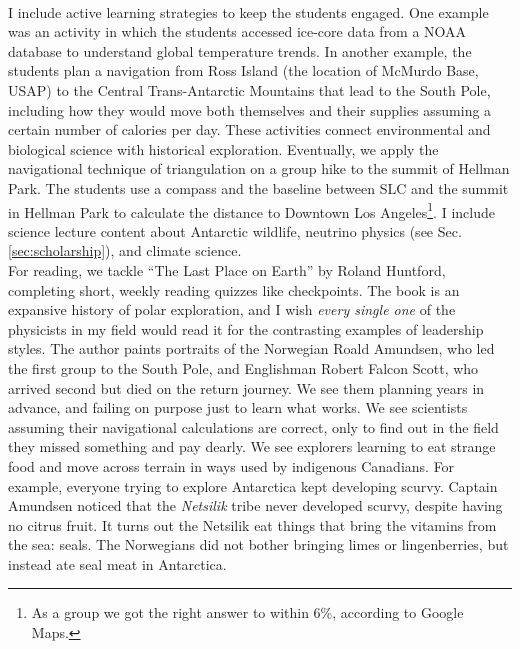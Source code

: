\documentclass[../../../main.tex]{subfiles}
\begin{document}
\\
\vspace{0.15cm}
I include active learning strategies to keep the students engaged.  One example was an activity in which the students accessed ice-core data from a NOAA database to understand global temperature trends.  In another example, the students plan a navigation from Ross Island (the location of McMurdo Base, USAP) to the Central Trans-Antarctic Mountains that lead to the South Pole, including how they would move both themselves and their supplies assuming a certain number of calories per day.  These activities connect environmental and biological science with historical exploration.  Eventually, we apply the navigational technique of triangulation on a group hike to the summit of Hellman Park.  The students use a compass and the baseline between SLC and the summit in Hellman Park to calculate the distance to Downtown Los Angeles\footnote{As a group we got the right answer to within 6\%, according to Google Maps.}.  I include science lecture content about Antarctic wildlife, neutrino physics (see Sec. \ref{sec:scholarship}), and climate science.
\\
\vspace{0.15cm}
For reading, we tackle ``The Last Place on Earth'' by Roland Huntford, completing short, weekly reading quizzes like checkpoints.  The book is an expansive history of polar exploration, and I wish \textit{every single one} of the physicists in my field would read it for the contrasting examples of leadership styles.  The author paints portraits of the Norwegian Roald Amundsen, who led the first group to the South Pole, and Englishman Robert Falcon Scott, who arrived second but died on the return journey.  We see them planning years in advance, and failing on purpose just to learn what works.  We see scientists assuming their navigational calculations are correct, only to find out in the field they missed something and pay dearly.  We see explorers learning to eat strange food and move across terrain in ways used by indigenous Canadians.  For example, everyone trying to explore Antarctica kept developing scurvy.  Captain Amundsen noticed that the \textit{Netsilik} tribe never developed scurvy, despite having no citrus fruit.  It turns out the Netsilik eat things that bring the vitamins from the sea: seals.  The Norwegians did not bother bringing limes or lingenberries, but instead ate seal meat in Antarctica.
\\
\vspace{0.15cm}
\end{document}
